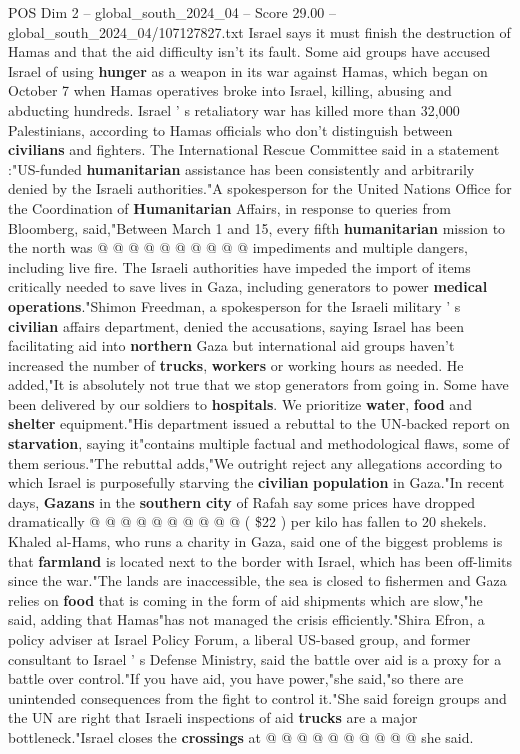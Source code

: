 \begin{textsample}{POS Dim 2 – global\_south\_2024\_04 – Score 29.00 – global\_south\_2024\_04/107127827.txt}
Israel says it must finish the destruction of Hamas and that the aid difficulty isn't its fault.
Some aid groups have accused Israel of using \textbf{hunger} as a weapon in its war against Hamas, which began on October 7 when Hamas operatives broke into Israel, killing, abusing and abducting hundreds.
Israel ' s retaliatory war has killed more than 32,000 Palestinians, according to Hamas officials who don't distinguish between \textbf{civilians} and fighters.
The International Rescue Committee said in a statement :"US-funded \textbf{humanitarian} assistance has been consistently and arbitrarily denied by the Israeli authorities."A spokesperson for the United Nations Office for the Coordination of \textbf{Humanitarian} Affairs, in response to queries from Bloomberg, said,"Between March 1 and 15, every fifth \textbf{humanitarian} mission to the north was @ @ @ @ @ @ @ @ @ @ impediments and multiple dangers, including live fire.
The Israeli authorities have impeded the import of items critically needed to save lives in Gaza, including generators to power \textbf{medical} \textbf{operations}."Shimon Freedman, a spokesperson for the Israeli military ' s \textbf{civilian} affairs department, denied the accusations, saying Israel has been facilitating aid into \textbf{northern} Gaza but international aid groups haven't increased the number of \textbf{trucks}, \textbf{workers} or working hours as needed.
He added,"It is absolutely not true that we stop generators from going in.
Some have been delivered by our soldiers to \textbf{hospitals}.
We prioritize \textbf{water}, \textbf{food} and \textbf{shelter} equipment."His department issued a rebuttal to the UN-backed report on \textbf{starvation}, saying it"contains multiple factual and methodological flaws, some of them serious."The rebuttal adds,"We outright reject any allegations according to which Israel is purposefully starving the \textbf{civilian} \textbf{population} in Gaza."In recent days, \textbf{Gazans} in the \textbf{southern} \textbf{city} of Rafah say some prices have dropped dramatically @ @ @ @ @ @ @ @ @ @ ( \$22 ) per kilo has fallen to 20 shekels.
Khaled al-Hams, who runs a charity in Gaza, said one of the biggest problems is that \textbf{farmland} is located next to the border with Israel, which has been off-limits since the war."The lands are inaccessible, the sea is closed to fishermen and Gaza relies on \textbf{food} that is coming in the form of aid shipments which are slow,"he said, adding that Hamas"has not managed the crisis efficiently."Shira Efron, a policy adviser at Israel Policy Forum, a liberal US-based group, and former consultant to Israel ' s Defense Ministry, said the battle over aid is a proxy for a battle over control."If you have aid, you have power,"she said,"so there are unintended consequences from the fight to control it."She said foreign groups and the UN are right that Israeli inspections of aid \textbf{trucks} are a major bottleneck."Israel closes the \textbf{crossings} at @ @ @ @ @ @ @ @ @ @ she said.

\end{textsample}
